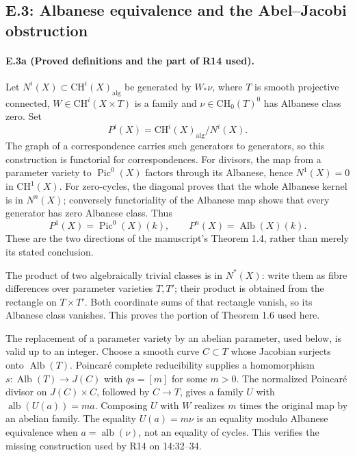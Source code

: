 \subsection{E.3: Albanese equivalence and the Abel--Jacobi obstruction}
\label{sec:albanese-family-audit}

\paragraph{E.3a (Proved definitions and the part of R14 used).}
Let $N^i(X)\subset\mathrm{CH}^i(X)_{\mathrm{alg}}$ be generated by
$W_*\nu$, where $T$ is smooth projective connected,
$W\in\mathrm{CH}^i(X\times T)$ is a family and
$\nu\in\mathrm{CH}_0(T)^0$ has Albanese class zero. Set
\[
 P^i(X)=\mathrm{CH}^i(X)_{\mathrm{alg}}/N^i(X).
\]
The graph of a correspondence carries such generators to generators,
so this construction is functorial for correspondences. For divisors,
the map from a parameter variety to $\operatorname{Pic}^0(X)$ factors
through its Albanese, hence $N^1(X)=0$ in $\mathrm{CH}^1(X)$.
For zero-cycles, the diagonal proves that the whole Albanese kernel
is in $N^n(X)$; conversely functoriality of the Albanese map shows
that every generator has zero Albanese class. Thus
\[
 P^1(X)=\operatorname{Pic}^0(X)(k),\qquad
 P^n(X)=\operatorname{Alb}(X)(k).
\]
These are the two directions of the manuscript's Theorem 1.4, rather
than merely its stated conclusion.

The product of two algebraically trivial classes is in $N^*(X)$:
write them as fibre differences over parameter varieties $T,T'$;
their product is obtained from the rectangle on $T\times T'$.
Both coordinate sums of that rectangle vanish, so its Albanese
class vanishes. This proves the portion of Theorem 1.6 used here.

The replacement of a parameter variety by an abelian parameter,
used below, is valid up to an integer. Choose a smooth curve
$C\subset T$ whose Jacobian surjects onto $\operatorname{Alb}(T)$.
Poincar\'e complete reducibility supplies a homomorphism
$s:\operatorname{Alb}(T)\to J(C)$ with
$q s=[m]$ for some $m>0$. The normalized Poincar\'e divisor on
$J(C)\times C$, followed by $C\to T$, gives a family $U$ with
$\operatorname{alb}(U(a))=ma$. Composing $U$ with $W$ realizes
$m$ times the original map by an abelian family. The equality
$U(a)=m\nu$ is an equality modulo Albanese equivalence when
$a=\operatorname{alb}(\nu)$, not an equality of cycles. This verifies
the missing construction used by R14 on 14:32--34.


